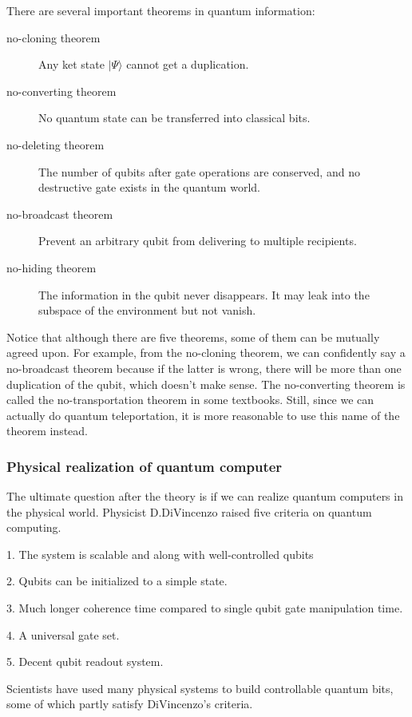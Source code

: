 There are several important theorems in quantum information\cite{RN34}:
\begin{description}
    \item[no-cloning theorem] Any ket state $|\Psi\rangle$ cannot get a duplication.
    \item[no-converting theorem] No quantum state can be transferred into classical bits.
    \item[no-deleting theorem] The number of qubits after gate operations are conserved, and no destructive gate exists in the quantum world.
    \item[no-broadcast theorem] Prevent an arbitrary qubit from delivering to multiple recipients. 
    \item[no-hiding theorem] The information in the qubit never disappears. It may leak into the subspace of the environment but not vanish.
\end{description}
Notice that although there are five theorems, some of them can be mutually agreed upon. For example, from the no-cloning theorem, we can confidently say a no-broadcast theorem because if the latter is wrong, there will be more than one duplication of the qubit, which doesn't make sense. The no-converting theorem is called the no-transportation theorem in some textbooks. Still, since we can actually do quantum teleportation, it is more reasonable to use this name of the theorem instead.

\subsubsection{Physical realization of quantum computer}
The ultimate question after the theory is if we can realize quantum computers in the physical world. Physicist D.DiVincenzo raised five criteria on quantum computing.\cite{RN59}
\begin{description}
    \item 1. The system is scalable and along with well-controlled qubits
    \item 2. Qubits can be initialized to a simple state.
    \item 3. Much longer coherence time compared to single qubit gate manipulation time.
    \item 4. A universal gate set.
    \item 5. Decent qubit readout system.
\end{description}
Scientists have used many physical systems to build controllable quantum bits, some of which partly satisfy DiVincenzo's criteria.

